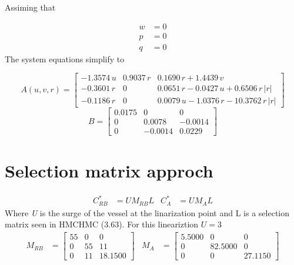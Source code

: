 \documentclass[12pt,a4]{article}
\begin{document}
Assiming that

\begin{align*}
	w & = 0 \\
	p & = 0 \\
	q & = 0
\end{align*}
The system equations simplify to

\begin{equation}
	A(u,v,r) = \left[\begin{array}{ccc} -1.3574\,u & 0.9037\,r & 0.1690\,r+1.4439\,v\\ -0.3601\,r & 0 & 0.0651\,r-0.0427\,u+0.6506\,r\,\left|r\right|\\ -0.1186\,r & 0 & 0.0079\,u-1.0376\,r-10.3762\,r\,\left|r\right| \end{array}\right]
\end{equation}
\begin{equation}
	B = \left[\begin{array}{ccc} 0.0175 & 0 & 0\\ 0 & 0.0078 & -0.0014\\ 0 & -0.0014 & 0.0229 \end{array}\right]
\end{equation}


\section{Selection matrix approch}

\begin{align}
	C^*_{RB} & = UM_{RB}L
	         &
	C^*_{A}  & = UM_AL
\end{align}
Where \textit{U} is the surge of the vessel at the linarization point and L is a selection matrix seen in HMCHMC (3.63).
For this lineariztion $U=3$
\begin{align}
	M_{RB} & = \left[\begin{array}{ccc} 55 & 0 & 0\\ 0 & 55 & 11\\ 0 & 11 & 18.1500 \end{array}\right]
	       &
	M_{A}  & = \left[\begin{array}{ccc} 5.5000 & 0 & 0\\ 0 & 82.5000 & 0\\ 0 & 0 & 27.1150 \end{array}\right]
\end{align}
\end{document}
